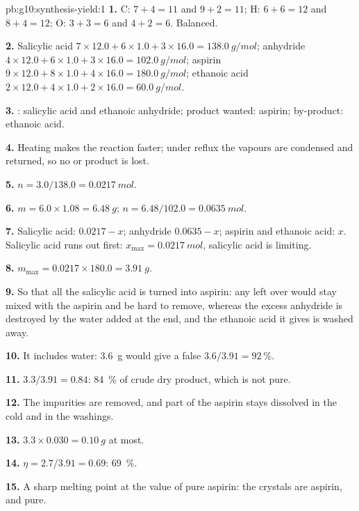 \begin{solution}{pb:g10:synthesis-yield:1}
\textbf{1.} C: $7 + 4 = 11$ and $9 + 2 = 11$; H: $6 + 6 = 12$ and
$8 + 4 = 12$; O: $3 + 3 = 6$ and $4 + 2 = 6$. Balanced.

\textbf{2.} Salicylic acid $7 \times 12.0 + 6 \times 1.0 + 3 \times 16.0
= \qty{138.0}{g/mol}$; anhydride $4 \times 12.0 + 6 \times 1.0 +
3 \times 16.0 = \qty{102.0}{g/mol}$; aspirin $9 \times 12.0 + 8 \times
1.0 + 4 \times 16.0 = \qty{180.0}{g/mol}$; ethanoic acid $2 \times 12.0
+ 4 \times 1.0 + 2 \times 16.0 = \qty{60.0}{g/mol}$.

\textbf{3.} : salicylic acid and ethanoic anhydride; product
wanted: aspirin; by-product: ethanoic acid.

\textbf{4.} Heating makes the reaction faster; under reflux the vapours
are condensed and returned, so no  or product is lost.

\textbf{5.} $n = 3.0 / 138.0 = \qty{0.0217}{mol}$.

\textbf{6.} $m = 6.0 \times 1.08 = \qty{6.48}{g}$;
$n = 6.48 / 102.0 = \qty{0.0635}{mol}$.

\textbf{7.} Salicylic acid: $0.0217 - x$; anhydride $0.0635 - x$;
aspirin and ethanoic acid: $x$. Salicylic acid runs out first:
$x_{\max} = \qty{0.0217}{mol}$, salicylic acid is limiting.

\textbf{8.} $m_{\max} = 0.0217 \times 180.0 = \qty{3.91}{g}$.

\textbf{9.} So that all the salicylic acid is turned into aspirin: any
left over would stay mixed with the aspirin and be hard to remove,
whereas the excess anhydride is destroyed by the water added at the end,
and the ethanoic acid it gives is washed away.

\textbf{10.} It includes water: \qty{3.6}{g} would give a false
$3.6 / 3.91 = \qty{92}{\percent}$.

\textbf{11.} $3.3 / 3.91 = 0.84$: \qty{84}{\percent} of crude dry
product, which is not pure.

\textbf{12.} The impurities are removed, and part of the aspirin stays
dissolved in the cold  and in the washings.

\textbf{13.} $3.3 \times 0.030 = \qty{0.10}{g}$ at most.

\textbf{14.} $\eta = 2.7 / 3.91 = 0.69$: \qty{69}{\percent}.

\textbf{15.} A sharp melting point at the value of pure aspirin: the
crystals are aspirin, and pure.


\end{solution}
